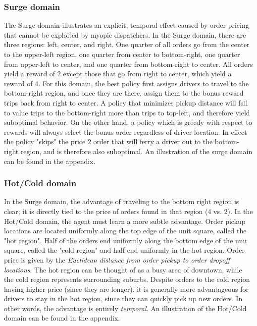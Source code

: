 \subsubsection{Surge domain} The Surge domain illustrates an explicit, temporal effect caused by order pricing that cannot be exploited by myopic dispatchers. In the Surge domain, there are three regions: left, center, and right. One quarter of all orders go from the center to the upper-left region, one quarter from center to bottom-right, one quarter from upper-left to center, and one quarter from bottom-right to center. All orders yield a reward of 2 except those that go from right to center, which yield a reward of 4. For this domain, the best policy first assigns drivers to travel to the bottom-right region, and once they are there, assign them to the bonus reward trips back from right to center. A policy that minimizes pickup distance will fail to value trips to the bottom-right more than trips to top-left, and therefore yield suboptimal behavior. On the other hand, a policy which is greedy with respect to rewards will always select the bonus order regardless of driver location. In effect the policy "skips" the price 2 order that will ferry a driver out to the bottom-right region, and is therefore also suboptimal. An illustration of the surge domain can be found in the appendix.

\subsubsection{Hot/Cold domain} In the Surge domain, the advantage of traveling to the bottom right region is clear; it is directly tied to the price of orders found in that region (4 vs. 2). In the Hot/Cold domain, the agent must learn a more subtle advantage. Order pickup locations are located uniformly along the top edge of the unit square, called the "hot region". Half of the orders end uniformly along the bottom edge of the unit square, called the "cold region" and half end uniformly in the hot region. Order price is given by the {\em Euclidean distance from order pickup to order dropoff locations}. The hot region can be thought of as a busy area of downtown, while the cold region represents surrounding suburbs. Despite orders to the cold region having higher price (since they are longer), it is generally more advantageous for drivers to stay in the hot region, since they can quickly pick up new orders. In other words, the advantage is entirely {\em temporal}. An illustration of the Hot/Cold domain can be found in the appendix. 

